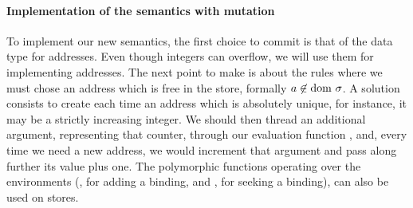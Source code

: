 \paragraph{Implementation of the semantics with mutation}

To implement our new semantics, the first choice to commit is that of
the \OCaml data type for addresses. Even though \OCaml integers can
overflow, we will use them for implementing addresses. The next point
to make is about the rules where we must chose an address which is
free in the store, formally $a \not\in \mathrm{dom}~\sigma$. A solution
consists to create each time an address which is absolutely unique,
for instance, it may be a strictly increasing integer. We should then
thread an additional argument, representing that counter, through our
evaluation function , and, every time we need a new
address, we would increment that argument and pass along further its
value plus one. The polymorphic functions operating over the
environments (, for adding a binding, and
, for seeking a binding), can also be used on stores.
